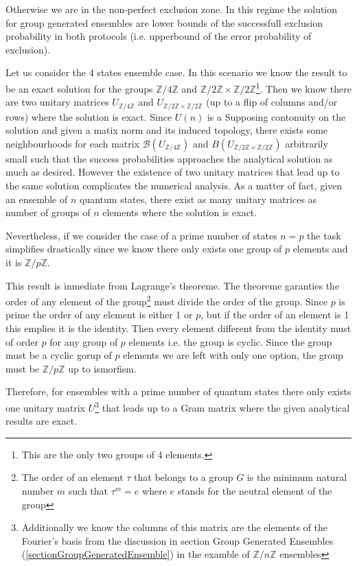 \documentclass[12pt,letterpaper]{article}
\begin{document}
\begin{multicols}{2}
Otherwise we are in the non-perfect exclusion zone. In this regime the solution for group generated ensembles are lower bounds of the successfull exclusion probability in both protocols (i.e. upperbound of the error probability of exclusion).

Let us consider the 4 states ensemble case. In this scenario we know the result to be an exact solution for the groups $\mathbb{Z}/4\mathbb{Z}$ and $\mathbb{Z}/2\mathbb{Z}\times\mathbb{Z}/2\mathbb{Z}$\footnote{This are the only two groups of 4 elements.}. Then we know there are two unitary matrices  $U_{\mathbb{Z}/4\mathbb{Z}}$ and $U_{\mathbb{Z}/2\mathbb{Z}\times\mathbb{Z}/2\mathbb{Z}}$ (up to a flip of columns and/or rows) where the solution is exact. Since $U(n)$ is a Supposing contonuity on the solution and given a matix norm and its induced topology, there exists some neighbourhoods for each matrix $\mathcal{B}(U_{\mathbb{Z}/4\mathbb{Z}})$ and $B(U_{\mathbb{Z}/2\mathbb{Z}\times\mathbb{Z}/2\mathbb{Z}})$ arbitrarily small such that the success probabilities approaches the analytical solution as much as desired. However the existence of two unitary matrices that lead up to the same solution complicates the numerical analysis. As a matter of fact, given an ensemble of $n$ quantum states, there exist as many unitary matrices as number of groups of $n$ elements where the solution is exact. 

Nevertheless, if we consider the case of a prime number of states $n=p$ the task simplifies drastically since we know there only exists one group of $p$ elements and it is $\mathbb{Z}/p\mathbb{Z}$. 

This result is inmediate from Lagrange's theoreme. The theoreme garanties the order of any element of the group\footnote{The order of an element $\tau$ that belongs to a group $G$ is the minimum natural number $m$ such that $\tau^m=e$ where $e$ stands for the neutral element of the group} must divide the order of the group. Since $p$ is prime the order of any element is either 1 or $p$, but if the order of an element is 1 this emplies it is the identity. Then every element different from the identity must of order $p$ for any group of $p$ elements i.e. the group is cyclic. Since the group must be a cyclic gorup of $p$ elements we are left with only one option, the group must be $\mathbb{Z}/p\mathbb{Z}$ up to ismorfism.

Therefore, for ensembles with a prime number of quantum states there only exists one unitary matrix $U$\footnote{Additionally we know the columns of this matrix are the elements of the Fourier's basis from the discussion in section Group Generated Ensembles (\ref{sectionGroupGeneratedEnsemble}) in the examble of $\mathbb{Z}/n\mathbb{Z}$ ensembles} that leads up to a Gram matrix where the given analytical results are exact.



\end{multicols}
\end{document}

